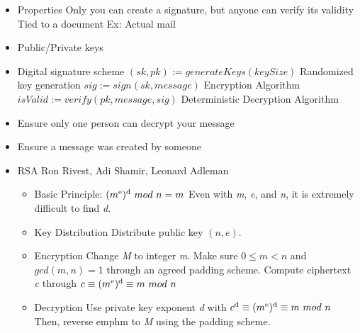 \documentclass{article}
\begin{document}
\begin{itemize}
  \item Properties
    \subitem Only you can create a signature, but anyone can verify its validity
    \subitem Tied to a document
    \subitem Ex: Actual mail
  \item Public/Private keys
  \item Digital signature scheme
    \subitem $ (sk, pk) := generateKeys(keySize) $ Randomized key generation
    \subitem $ sig := sign(sk, message) $ Encryption Algorithm
    \subitem $ isValid := verify(pk, message, sig) $ Deterministic Decryption Algorithm
  \item Ensure only one person can decrypt your message
  \item Ensure a message was created by someone
  \item RSA
    \subitem Ron Rivest, Adi Shamir, Leonard Adleman
    \begin{itemize}
      \item Basic Principle: $ (m\textsuperscript{e})\textsuperscript{d}\ mod\ n = m $
        \subitem Even with \emph{m}, \emph{e}, and \emph{n}, it is extremely difficult to find \emph{d}.
      \item Key Distribution
        \subitem Distribute public key $ (n, e) $. 
      \item Encryption
        \subitem Change \emph{M} to integer \emph{m}. Make sure $ 0 \leq m < n $ and $ gcd(m, n) = 1 $ through an agreed padding scheme.
        \subitem Compute ciphertext \emph{c} through $ c \equiv (m\textsuperscript{e})\textsuperscript{d} \equiv m\ mod\ n $
      \item Decryption
        \subitem Use private key exponent \emph{d} with $ c\textsuperscript{d} \equiv (m\textsuperscript{e})\textsuperscript{d} \equiv m\ mod\ n $
        \subitem Then, reverse emph{m} to \emph{M} using the padding scheme.


\end{itemize}
\end{itemize}
\end{document}

